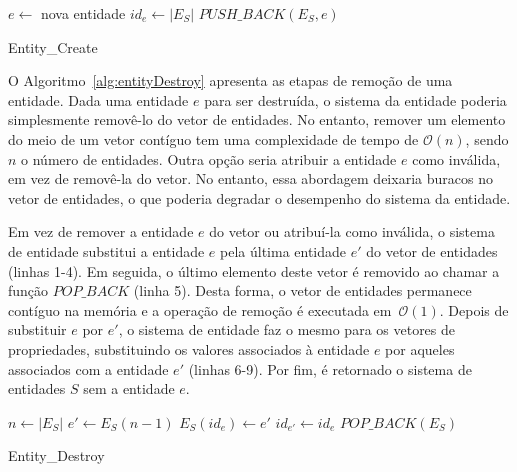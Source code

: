 \begin{algorithm}[ht]
 \LinesNumbered
      $e \gets $ nova entidade\;
      $id_e \gets |E_S|$\;
      $PUSH\_BACK(E_S, e)$\;
      \;
   \caption{Entity\_Create}
   \label{alg:entityCreate}
 \end{algorithm}

 O Algoritmo~\ref{alg:entityDestroy} apresenta as etapas de remoção de uma entidade. Dada uma entidade $ e $ para ser destruída, o sistema da entidade poderia simplesmente removê-lo do vetor de entidades. No entanto, remover um elemento do meio de um vetor contíguo tem uma complexidade de tempo de $\mathcal{O}(n)$, sendo $ n $ o número de entidades. Outra opção seria atribuir a entidade $ e $ como inválida, em vez de removê-la do vetor. No entanto, essa abordagem deixaria buracos no vetor de entidades, o que poderia degradar o desempenho do sistema da entidade.

  Em vez de remover a entidade $ e $ do vetor ou atribuí-la como inválida, o sistema de entidade substitui a entidade $e$ pela última entidade $e'$ do vetor de entidades (linhas 1-4). Em seguida, o último elemento deste vetor é removido ao chamar a função $ POP\_BACK $ (linha 5). Desta forma, o vetor de entidades permanece contíguo na memória e a operação de remoção é executada em~$\mathcal{O}(1)$. Depois de substituir $ e $ por $ e' $, o sistema de entidade faz o mesmo para os vetores de propriedades, substituindo os valores associados à entidade $ e $ por aqueles associados com a entidade $ e' $ (linhas 6-9). Por fim, é retornado o sistema de entidades $S$ sem a entidade $e$.

 \begin{algorithm} [ht]
  \LinesNumbered
         $n \gets |E_S|$\;
         $e' \gets E_S(n-1)$\;
         $E_S(id_e) \gets e'$\;
         $id_{e'} \gets id_e$\;
         $POP\_BACK(E_S)$\;
         \;
    \caption{Entity\_Destroy}
    \label{alg:entityDestroy}
  \end{algorithm}



